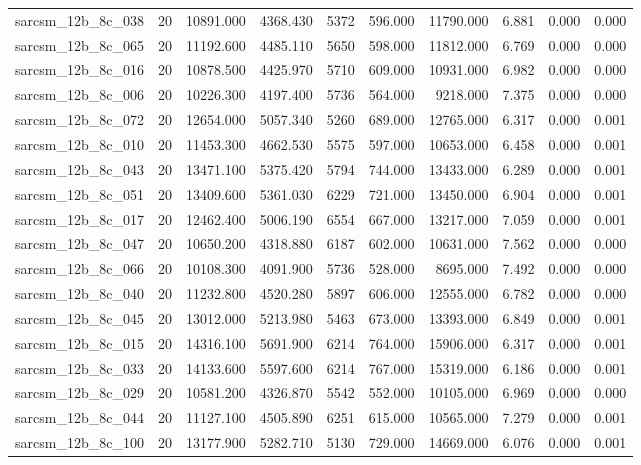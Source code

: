 \begin{tabular}{lrrrrrrrrr}
sarcsm\_12b\_8c\_038 & 20 & 10891.000 & 4368.430 & 5372 & 596.000 & 11790.000 & 6.881 & 0.000 & 0.000 \\
sarcsm\_12b\_8c\_065 & 20 & 11192.600 & 4485.110 & 5650 & 598.000 & 11812.000 & 6.769 & 0.000 & 0.000 \\
sarcsm\_12b\_8c\_016 & 20 & 10878.500 & 4425.970 & 5710 & 609.000 & 10931.000 & 6.982 & 0.000 & 0.000 \\
sarcsm\_12b\_8c\_006 & 20 & 10226.300 & 4197.400 & 5736 & 564.000 & 9218.000 & 7.375 & 0.000 & 0.000 \\
sarcsm\_12b\_8c\_072 & 20 & 12654.000 & 5057.340 & 5260 & 689.000 & 12765.000 & 6.317 & 0.000 & 0.001 \\
sarcsm\_12b\_8c\_010 & 20 & 11453.300 & 4662.530 & 5575 & 597.000 & 10653.000 & 6.458 & 0.000 & 0.001 \\
sarcsm\_12b\_8c\_043 & 20 & 13471.100 & 5375.420 & 5794 & 744.000 & 13433.000 & 6.289 & 0.000 & 0.001 \\
sarcsm\_12b\_8c\_051 & 20 & 13409.600 & 5361.030 & 6229 & 721.000 & 13450.000 & 6.904 & 0.000 & 0.001 \\
sarcsm\_12b\_8c\_017 & 20 & 12462.400 & 5006.190 & 6554 & 667.000 & 13217.000 & 7.059 & 0.000 & 0.001 \\
sarcsm\_12b\_8c\_047 & 20 & 10650.200 & 4318.880 & 6187 & 602.000 & 10631.000 & 7.562 & 0.000 & 0.000 \\
sarcsm\_12b\_8c\_066 & 20 & 10108.300 & 4091.900 & 5736 & 528.000 & 8695.000 & 7.492 & 0.000 & 0.000 \\
sarcsm\_12b\_8c\_040 & 20 & 11232.800 & 4520.280 & 5897 & 606.000 & 12555.000 & 6.782 & 0.000 & 0.000 \\
sarcsm\_12b\_8c\_045 & 20 & 13012.000 & 5213.980 & 5463 & 673.000 & 13393.000 & 6.849 & 0.000 & 0.001 \\
sarcsm\_12b\_8c\_015 & 20 & 14316.100 & 5691.900 & 6214 & 764.000 & 15906.000 & 6.317 & 0.000 & 0.001 \\
sarcsm\_12b\_8c\_033 & 20 & 14133.600 & 5597.600 & 6214 & 767.000 & 15319.000 & 6.186 & 0.000 & 0.001 \\
sarcsm\_12b\_8c\_029 & 20 & 10581.200 & 4326.870 & 5542 & 552.000 & 10105.000 & 6.969 & 0.000 & 0.000 \\
sarcsm\_12b\_8c\_044 & 20 & 11127.100 & 4505.890 & 6251 & 615.000 & 10565.000 & 7.279 & 0.000 & 0.001 \\
sarcsm\_12b\_8c\_100 & 20 & 13177.900 & 5282.710 & 5130 & 729.000 & 14669.000 & 6.076 & 0.000 & 0.001 \\

\end{tabular}
